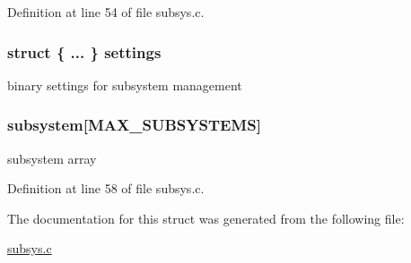 Definition at line 54 of file subsys.\+c.

\hypertarget{structsystem__t_aa55cb52ba643b2fa105ab8910555bf64}{}
\subsubsection[{settings}]{\setlength{\rightskip}{0pt plus 5cm}struct \{ ... \}   settings}\label{structsystem__t_aa55cb52ba643b2fa105ab8910555bf64}
binary settings for subsystem management \hypertarget{structsystem__t_ad43fe3cf1c5e9944d8e0b98f8be0c5a4}{}
\subsubsection[{subsystem}]{ subsystem\mbox{[}{\bf M\+A\+X\+\_\+\+S\+U\+B\+S\+Y\+S\+T\+E\+M\+S}\mbox{]}}\label{structsystem__t_ad43fe3cf1c5e9944d8e0b98f8be0c5a4}
subsystem array 

Definition at line 58 of file subsys.\+c.



The documentation for this struct was generated from the following file\+:\begin{DoxyCompactItemize}
\item 
\hyperlink{subsys_8c}{subsys.\+c}\end{DoxyCompactItemize}
